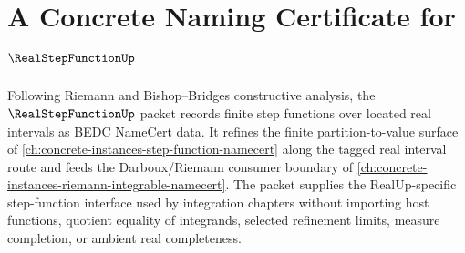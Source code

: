\chapter{A Concrete Naming Certificate for $\RealStepFunctionUp$}
\label{ch:concrete-instances-real-step-function-namecert}

Following Riemann and Bishop--Bridges constructive analysis, the $\RealStepFunctionUp$ packet records finite step functions over located real intervals as BEDC NameCert data. It refines the finite partition-to-value surface of \autoref{ch:concrete-instances-step-function-namecert} along the tagged real interval route and feeds the Darboux/Riemann consumer boundary of \autoref{ch:concrete-instances-riemann-integrable-namecert}. The packet supplies the RealUp-specific step-function interface used by integration chapters without importing host functions, quotient equality of integrands, selected refinement limits, measure completion, or ambient real completeness.

